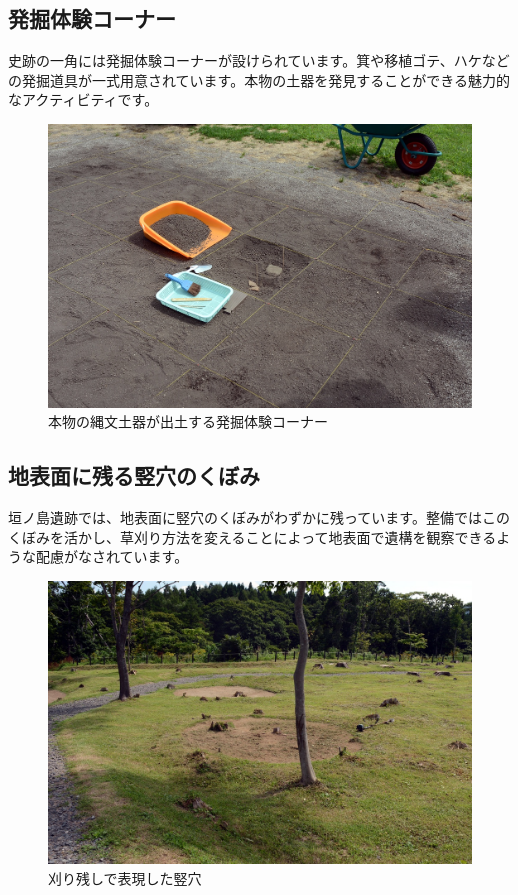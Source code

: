 \documentclass[a4j,11pt,twocolumn,openany]{jsbook}
\begin{document}
\subsection{発掘体験コーナー}

史跡の一角には発掘体験コーナーが設けられています。箕や移植ゴテ、ハケなどの発掘道具が一式用意されています。本物の土器を発見することができる魅力的なアクティビティです。

\begin{figure}[ht]
	\centering
	\includegraphics[width=\linewidth]{fig/01_Iseki_kengaku/14Hakkutu_taiken.JPG}
	\caption{
		本物の縄文土器が出土する発掘体験コーナー}
	\label{}
\end{figure}

\subsection{地表面に残る竪穴のくぼみ}

垣ノ島遺跡では、地表面に竪穴のくぼみがわずかに残っています。整備ではこのくぼみを活かし、草刈り方法を変えることによって地表面で遺構を観察できるような配慮がなされています。

\begin{figure}[ht]
	\centering
	\includegraphics[width=\linewidth]{fig/01_Iseki_kengaku/15Kakinosima_tateana.JPG}
	\caption{刈り残しで表現した竪穴}
	\label{}
\end{figure}
\end{document}
